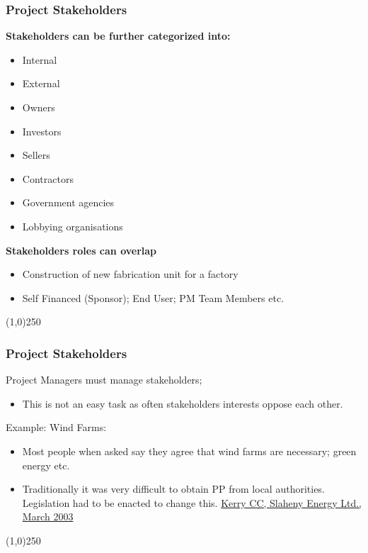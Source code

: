 \begin{frame}
\frametitle{Project Stakeholders}
\textbf{Stakeholders can be further categorized into:}\\
	\begin{itemize}
	\item Internal
	\item External
	\item Owners
	\item Investors
	\item Sellers
	\item Contractors
	\item Government agencies
	\item Lobbying organisations
	\end{itemize}
\textbf{Stakeholders roles can overlap}\\
	\begin{itemize}
	\item Construction of new fabrication unit for a factory
	\item Self Financed (Sponsor); End User; PM Team Members etc.
	\end{itemize}
\end{frame}
\begin{center}\line(1,0){250}\end{center}



\begin{frame}
\frametitle{Project Stakeholders}
Project Managers must manage stakeholders; \\
\begin{itemize}
	\item This is not an easy task as often stakeholders interests oppose each other.
\end{itemize}
Example: Wind Farms:\\
	\begin{itemize}
		\item Most people when asked say they agree that wind farms are necessary; green energy etc.
		\item Traditionally it was very difficult to obtain PP from local authorities. Legislation had to be enacted to change this. \href{http://www1.pleanala.ie/REP/200/R200723.DOC}{Kerry CC, Slaheny Energy Ltd., March 2003}
	\end{itemize}

\end{frame}
\begin{center}\line(1,0){250}\end{center}



